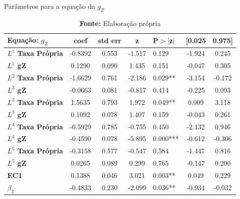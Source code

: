 	\begin{table}[H]
		\begin{center}
		\caption{Parâmetros para a equação da $g_Z$}	
	\begin{tabular}{lccclcc}
		\toprule
		\textbf{Equação:} $g_Z$ & \textbf{coef} & \textbf{std err} & \textbf{z} & \textbf{P$> |$z$|$} & \textbf{[0.025} & \textbf{0.975]}  \\
		\midrule
		\textbf{$L^1 $ Taxa Própria} &      -0.8392  &        0.553     &    -1.517  &         0.129        &       -1.924    &        0.245     \\
		\textbf{$L^1 $ gZ}           &       0.1290  &        0.090     &     1.435  &         0.151        &       -0.047    &        0.305     \\
		\textbf{$L^2 $ Taxa Própria} &      -1.6629  &        0.761     &    -2.186  &         0.029**        &       -3.154    &       -0.172     \\
		\textbf{$L^2 $ gZ}           &      -0.0663  &        0.081     &    -0.817  &         0.414        &       -0.225    &        0.093     \\
		\textbf{$L^3 $ Taxa Própria} &       1.5635  &        0.793     &     1.972  &         0.049**        &        0.009    &        3.118     \\
		\textbf{$L^3 $ gZ}           &       0.1092  &        0.078     &     1.407  &         0.159        &       -0.043    &        0.261     \\
		\textbf{$L^4 $ Taxa Própria} &      -0.5929  &        0.785     &    -0.755  &         0.450        &       -2.132    &        0.946     \\
		\textbf{$L^4 $ gZ}           &      -0.4590  &        0.078     &    -5.895  &         0.000***        &       -0.612    &       -0.306     \\
		\textbf{$L^5 $ Taxa Própria} &      -0.3158  &        0.577     &    -0.547  &         0.584        &       -1.447    &        0.816     \\
		\textbf{$L^5 $ gZ}           &       0.0265  &        0.089     &     0.299  &         0.765        &       -0.147    &        0.200     \\
		\textbf{EC1} &       0.1388  &        0.046     &     3.021  &         0.003**        &        0.049    &        0.229     \\
		\textbf{$\beta_2$ } &      -0.4833  &        0.230     &    -2.099  &         0.036**        &       -0.934    &       -0.032     \\\bottomrule
	\end{tabular}
\caption*{\textbf{Fonte:} Elaboração própria}
\end{center}
\end{table}
